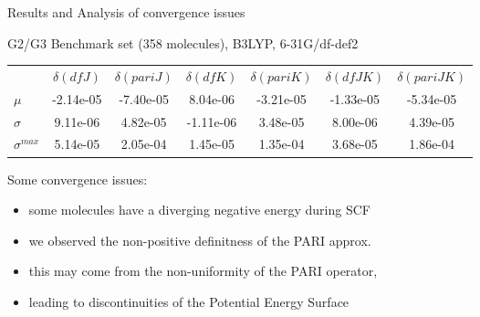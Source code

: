 \begin{frame}{Results and Analysis of convergence issues}
\footnotesize



\begin{center}
G2/G3   Benchmark set (358 molecules), B3LYP, 6-31G/df-def2
\begin{tabular}{lcccccc}
\hline 
           & $\delta (dfJ)$ & $\delta (pariJ)$ & $\delta (dfK)$ & $\delta (pariK)$ & $\delta (dfJK)$ & $\delta (pariJK)$ \\ 
           $\mu$  & -2.14e-05  & -7.40e-05  &  8.04e-06 & -3.21e-05 & -1.33e-05  & -5.34e-05  \\
          $\sigma$   &  9.11e-06  &  4.82e-05  & -1.11e-06 &  3.48e-05 &  8.00e-06  &  4.39e-05  \\
          $\sigma^{max}$  &  5.14e-05  &  2.05e-04  &  1.45e-05 &  1.35e-04 &  3.68e-05  &  1.86e-04 \\

\hline
\end{tabular}
\end{center}

Some convergence issues:
\begin{itemize}
\item some molecules have a diverging negative energy during SCF
\item we observed the non-positive definitness of the PARI approx.
\item this may come from the non-uniformity of the PARI operator, 
\item leading to discontinuities of the Potential Energy Surface
\end{itemize}

\end{frame}


